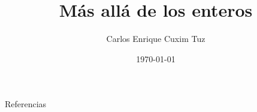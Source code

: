 \documentclass[notheorems, xcolor=table, aspectratio=169]{beamer}
\title{Más allá de los enteros}
\author{Carlos Enrique Cuxim Tuz}
\institute{Universidad Autónoma de Yucatán\\ Facultad de Matemáticas}
\date{\today}
\begin{document}
  \frame{\titlepage}


  

  

  

  

  

  

  
  
  \nocite{*}

  \begin{frame}[allowframebreaks]{Referencias}
    \printbibliography
  \end{frame}
\end{document}
